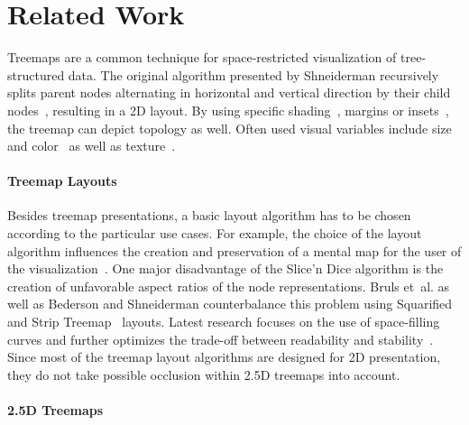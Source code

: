 

\section{Related Work}
\label{sec:related}

\noindent
Treemaps are a common technique for space-restricted visualization of tree-structured data. The original algorithm presented by Shneiderman recursively splits parent nodes alternating in horizontal and vertical direction by their child nodes~\cite{Shneiderman1992}, resulting in a 2D layout.
By using specific shading~\cite{VanWijk1999}, margins or insets~\cite{Lue2008}, the treemap can depict topology as well.
Often used visual variables include size and color~\cite{Fekete2002} as well as texture~\cite{Holten2005}.

\paragraph{Treemap Layouts}

Besides treemap presentations, a basic layout algorithm has to be chosen according to the particular use cases.
For example, the choice of the layout algorithm influences the creation and preservation of a mental map for the user of the visualization~\cite{Misue1995}.
One major disadvantage of the Slice'n Dice algorithm is the creation of unfavorable aspect ratios of the node representations. Bruls et~al. as well as Bederson and Shneiderman counterbalance this problem using Squarified~\cite{Bruls1999} and Strip Treemap~\cite{Bederson2002} layouts.
Latest research focuses on the use of space-filling curves and further optimizes the trade-off between readability and stability~\cite{Tu2007,Tak2013}.
Since most of the treemap layout algorithms are designed for 2D presentation, they do not take possible occlusion within 2.5D treemaps into account.

\paragraph{2.5D Treemaps}

